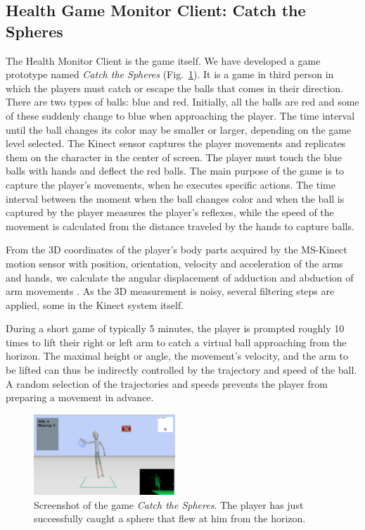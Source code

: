\documentclass[10pt, conference, compsocconf]{IEEEtran}
\begin{document}
\subsection{Health Game Monitor Client: Catch the Spheres}

The Health Monitor Client is the game itself. We have developed a game prototype named \emph{Catch the Spheres} (Fig.~\ref{img:catch}). It is a game in third person in which the players must catch or escape the balls that comes in their direction. There are two types of balls: blue and red. Initially, all the balls are red and some of these suddenly change to blue when approaching the player. The time interval until the ball changes its color may be smaller or larger, depending on the game level selected. The Kinect sensor captures the player movements and replicates them on the character in the center of screen. The player must touch the blue balls with hands and deflect the red balls. The main purpose of the game is to capture the player's movements, when he executes specific actions. The time interval between the moment when the ball changes color and when the ball is captured by the player measures the player's reflexes, while the speed of the movement is calculated from the distance traveled by the 
hands to capture balls.

From the 3D coordinates of the player's body parts acquired by the MS-Kinect motion sensor with position, orientation, velocity and acceleration of the arms and hands, we calculate the angular displacement of adduction and abduction of arm movements \cite{mcginnis2013biomechanics}. As the 3D measurement is noisy, several filtering steps are applied, some in the Kinect system itself. 

During a short game of typically 5 minutes, the player is prompted roughly 10 times to lift their right or left arm to catch a virtual ball approaching from the horizon. The maximal height or angle, the movement's velocity, and the arm to be lifted can thus be indirectly controlled by the trajectory and speed of the ball. A random selection of the trajectories and speeds prevents the player from preparing a movement in advance.

\begin{figure}[!htb]
	\centering
	\includegraphics[width=0.475\textwidth]{img/catch_colour.png}
	\caption{Screenshot of the game \emph{Catch the Spheres}. The
		player has just successfully caught a sphere that flew at him from the
		horizon.}
	\label{img:catch}
\end{figure}
\end{document}
